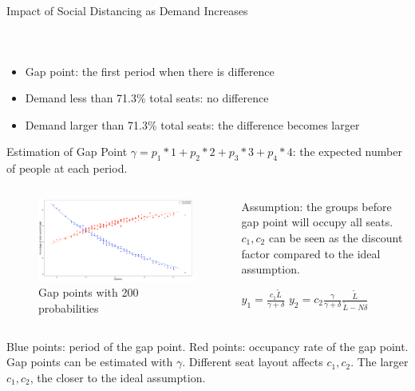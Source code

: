 \begin{frame}{Impact of Social Distancing as Demand Increases}
\begin{columns}
\begin{figure}[ht]
          \end{figure}
      \end{columns}
      \begin{itemize}
        \item Gap point: the first period when there is difference 
        \item Demand less than 71.3\% total seats: no difference
        \item Demand larger than 71.3\% total seats: the difference becomes larger
      \end{itemize}
  \end{frame}

    \begin{frame}{Estimation of Gap Point}
      \scriptsize
      $\gamma = p_1 * 1 + p_2 * 2 + p_3 * 3 + p_4 * 4$: the expected number of people at each period.
      \begin{columns}
        \begin{column}{0.8\textwidth}
      \begin{figure}[ht]
        \centering
        \includegraphics[width = 1\textwidth]{./images/gamma.pdf}
        \caption{Gap points with 200 probabilities}
    \end{figure}
  \end{column}

  \begin{column}{0.2\textwidth}
    Assumption: the groups before gap point will occupy all seats.
    $c_1, c_2$ can be seen as the discount factor compared to the ideal assumption.

    {\color{blue} $y_1 = \frac{c_1 \tilde{L}}{\gamma + \delta}$}
    {\color{red}  $y_2 = c_2 \frac{\gamma}{\gamma + \delta} \frac{\tilde{L}}{\tilde{L}-N \delta}$}
  \end{column}
  \end{columns}

    \scriptsize
    {\color{blue} Blue points}: period of the gap point.
    {\color{red} Red points}: occupancy rate of the gap point. 
    Gap points can be estimated with $\gamma$. Different seat layout affects $c_1, c_2$. The larger $c_1, c_2$, the closer to the ideal assumption.
    \end{frame}

